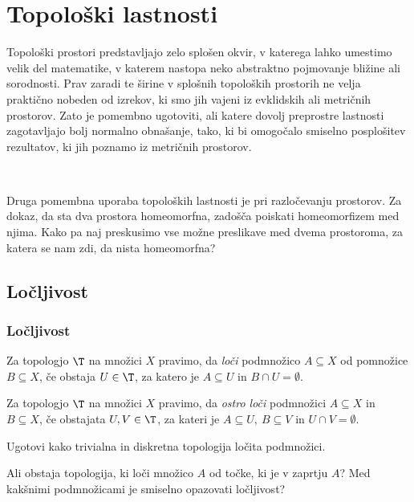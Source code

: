 \section{Topološki lastnosti}

Topološki prostori predstavljajo zelo splošen okvir, v katerega lahko umestimo velik del matematike, v katerem nastopa neko abstraktno pojmovanje bližine ali sorodnosti. Prav zaradi te širine v splošnih topoloških prostorih ne velja praktično nobeden od izrekov, ki smo jih vajeni iz evklidskih ali metričnih prostorov. Zato je pomembno ugotoviti, ali katere dovolj preprostre lastnosti zagotavljajo bolj normalno obnašanje, tako, ki bi omogočalo smiselno posplošitev rezultatov, ki jih poznamo iz metričnih prostorov.

\,

Druga pomembna uporaba topoloških lastnosti je pri razločevanju prostorov. Za dokaz, da sta dva prostora homeomorfna, zadošča poiskati homeomorfizem med njima. Kako pa naj preskusimo vse možne preslikave med dvema prostoroma, za katera se nam zdi, da nista homeomorfna?

\subsection{Ločljivost}
\subsubsection{Ločljivost}
\begin{definicija}
    Za topologjo $\T$ na množici $X$ pravimo, da \emph{loči} podmnožico $A \subseteq X$ od pomnožice $B \subseteq X$, če obstaja $U \in \T$, za katero je $A \subseteq U$ in $B \cap U = \emptyset$.
\end{definicija}

\begin{definicija}
    Za topologjo $\T$ na množici $X$ pravimo, da \emph{ostro loči} podmnožici $A \subseteq X$ in $B \subseteq X$, če obstajata $U, V \in \T$, za kateri je $A \subseteq U, \ B \subseteq V$ in $U \cap V = \emptyset$.
\end{definicija}

\begin{primer}
    Ugotovi kako trivialna in diskretna topologija ločita podmnožici.
\end{primer}

\begin{primer}
    Ali obstaja topologija, ki loči množico $A$ od točke, ki je v zaprtju $A$? Med kakšnimi podmnožicami je smiselno opazovati ločljivost?
\end{primer}

